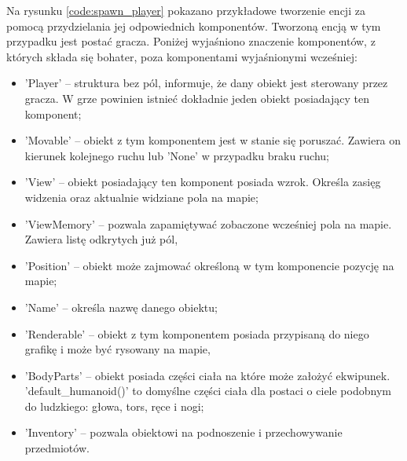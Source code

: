 \documentclass[12pt,twoside]{article}
\begin{document}
Na rysunku \ref{code:spawn_player} pokazano przykładowe tworzenie encji za pomocą przydzielania jej odpowiednich komponentów. Tworzoną encją w tym przypadku jest postać gracza. Poniżej wyjaśniono znaczenie komponentów, z których składa się bohater, poza komponentami wyjaśnionymi wcześniej:
\begin{itemize}	
	\item 'Player' -- struktura bez pól, informuje, że dany obiekt jest sterowany przez gracza. W grze powinien istnieć dokładnie jeden obiekt posiadający ten komponent;
	\item 'Movable' -- obiekt z tym komponentem jest w stanie się poruszać. Zawiera on kierunek kolejnego ruchu lub 'None' w przypadku braku ruchu;
	\item 'View' -- obiekt posiadający ten komponent posiada wzrok. Określa zasięg widzenia oraz aktualnie widziane pola na mapie;
	\item 'ViewMemory' -- pozwala zapamiętywać zobaczone wcześniej pola na mapie. Zawiera listę odkrytych już pól,
	\item 'Position' -- obiekt może zajmować określoną w tym komponencie pozycję na mapie;
	\item 'Name' -- określa nazwę danego obiektu;
	\item 'Renderable' -- obiekt z tym komponentem posiada przypisaną do niego grafikę i może być rysowany na mapie,
	\item 'BodyParts' -- obiekt posiada części ciała na które może założyć ekwipunek. 'default\_humanoid()' to domyślne części ciała dla postaci o ciele podobnym do ludzkiego: głowa, tors, ręce i nogi;
	\item 'Inventory' -- pozwala obiektowi na podnoszenie i przechowywanie przedmiotów.
\end{itemize}
\end{document}

